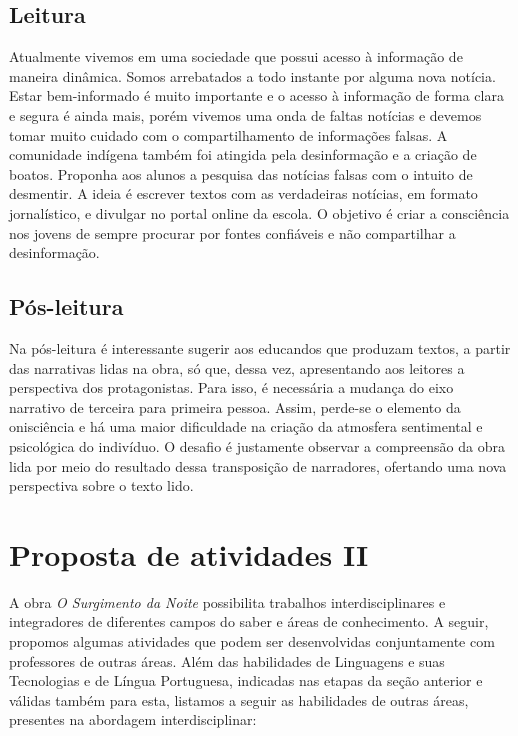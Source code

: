 \documentclass[12pt]{extarticle}
\begin{document}
\subsection{Leitura}


Atualmente vivemos em uma sociedade que possui acesso à
informação de maneira dinâmica. Somos arrebatados a todo instante por
alguma nova notícia. Estar bem-informado é muito importante e o acesso à
informação de forma clara e segura é ainda mais, porém vivemos uma onda
de faltas notícias e devemos tomar muito cuidado com o compartilhamento
de informações falsas. A comunidade indígena também foi atingida pela
desinformação e a criação de boatos. Proponha aos alunos a pesquisa das
notícias falsas com o intuito de desmentir. A ideia é escrever textos
com as verdadeiras notícias, em formato jornalístico, e divulgar no
portal online da escola. O objetivo é criar a consciência nos jovens de
sempre procurar por fontes confiáveis e não compartilhar a
desinformação.

\subsection{Pós-leitura}

Na pós-leitura é interessante sugerir aos educandos que
produzam textos, a partir das narrativas lidas na obra, só que, dessa
vez, apresentando aos leitores a perspectiva dos protagonistas. Para
isso, é necessária a mudança do eixo narrativo de terceira para primeira
pessoa. Assim, perde-se o elemento da onisciência e há uma maior
dificuldade na criação da atmosfera sentimental e psicológica do
indivíduo. O desafio é justamente observar a compreensão da obra lida
por meio do resultado dessa transposição de narradores, ofertando uma
nova perspectiva sobre o texto lido.


\section{Proposta de atividades II}


A obra \emph{O Surgimento da Noite} possibilita trabalhos
interdisciplinares e integradores de diferentes campos do saber e áreas
de conhecimento. A seguir, propomos algumas atividades que podem ser
desenvolvidas conjuntamente com professores de outras áreas. Além das
habilidades de Linguagens e suas Tecnologias e de Língua Portuguesa,
indicadas nas etapas da seção anterior e válidas também para esta,
listamos a seguir as habilidades de outras áreas, presentes na abordagem
interdisciplinar:
\end{document}

